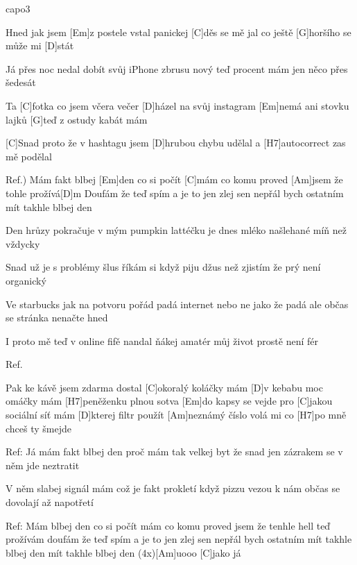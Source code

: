 \hfill capo3

Hned jak jsem [Em]z postele vstal
panickej [C]děs se mě jal
co ještě [G]horšího se může mi [D]stát

Já přes noc nedal dobít
svůj iPhone zbrusu nový
teď procent mám jen něco přes šedesát 

Ta [C]fotka co jsem včera večer
[D]házel na svůj instagram
[Em]nemá ani stovku lajků
[G]teď z ostudy kabát mám

[C]Snad proto že v hashtagu jsem
[D]hrubou chybu udělal
a [H7]autocorrect zas mě podělal

Ref.) 
Mám fakt blbej [Em]den
co si počít [C]mám
co komu proved [Am]jsem
že tohle prožívá[D]m\columnbreak
Doufám že teď spím
a je to jen zlej sen
nepřál bych ostatním
mít takhle blbej den 

Den hrůzy pokračuje
v mým pumpkin lattéčku je
dnes mléko našlehané míň než vždycky 

Snad už je s problémy šlus
říkám si když piju džus
než zjistím že prý není organický 
	
Ve starbucks jak na potvoru
pořád padá internet
nebo ne jako že padá ale
občas se stránka nenačte hned

I proto mě teď v online fifě
nandal ňákej amatér
můj život prostě není fér

Ref.

Pak ke kávě jsem zdarma dostal [C]okoralý koláčky
mám [D]v kebabu moc omáčky
mám [H7]peněženku plnou sotva [Em]do kapsy se vejde
pro [C]jakou sociální síť
mám [D]kterej filtr použít
[Am]neznámý číslo volá mi
co [H7]po mně chceš ty šmejde\columnbreak

Ref: Já mám fakt blbej den
proč mám tak velkej byt
že snad jen zázrakem 
se v něm jde neztratit 

V něm slabej signál mám
což je fakt prokletí 
když pizzu vezou k nám
občas se dovolají až napotřetí

Ref: Mám blbej den
co si počít mám
co komu proved jsem
že tenhle hell teď prožívám 
doufám že teď spím
a je to jen zlej sen
nepřál bych ostatním 
mít takhle blbej den
mít takhle blbej den
(4x)[Am]uooo 
[C]jako já 